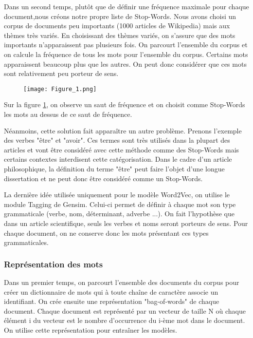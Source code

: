 \documentclass[12pt]{article}
\begin{document}
\noindent
Dans un second temps, plutôt que de définir une fréquence maximale pour chaque document,nous créons notre propre liste de Stop-Words.  Nous avons choisi un corpus de documents peu importants (1000 articles de Wikipedia) mais aux thèmes très variés. En choisissant des thèmes variés, on s'assure que des mots importants n'apparaissent pas plusieurs fois. On parcourt l'ensemble du corpus et on calcule la fréquence de tous les mots pour l'ensemble du corpus. Certains mots apparaissent beaucoup plus que les autres. On peut donc considérer que ces mots sont relativement peu porteur de sens. 



\begin{center}
    

\begin{figure}
    
    \texttt{[image: Figure\_1.png]}
    \caption{}
    \label{fig:stop_word}
\end{figure}
\end{center}
Sur la figure \ref{fig:stop_word}, on observe un saut de fréquence et on choisit comme Stop-Words les mots au dessus de ce saut de fréquence. 

\noindent
Néanmoins, cette solution fait apparaître un autre problème. Prenons l'exemple des verbes "être" et "avoir". Ces termes sont très utilisés dans la plupart des articles et vont être considéré avec cette méthode comme des Stop-Words mais certains contextes interdisent cette catégorisation. Dans le cadre d'un article philosophique, la définition du terme "être" peut faire l'objet d'une longue dissertation et ne peut donc être considéré comme un Stop-Words. 

\noindent
La dernière idée utilisée uniquement pour le modèle Word2Vec, on utilise le module Tagging de Gensim. Celui-ci permet de définir à chaque mot son type grammaticale (verbe, nom, déterminant, adverbe ...). On fait l'hypothèse que dans un article scientifique, seuls les verbes et noms seront porteurs de sens. Pour chaque document, on ne conserve donc les mots présentant ces types grammaticales.


\subsubsection{Représentation des mots}
\noindent
Dans un premier temps, on parcourt l'ensemble des documents du corpus pour créer un dictionnaire de mots qui à toute chaîne de caractère associe un identifiant. On crée ensuite une représentation "bag-of-words" de chaque document. Chaque document est représenté par un vecteur de taille N où chaque élément i du vecteur est le nombre d'occurrence du i-ème mot dans le document. On utilise cette représentation pour entraîner les modèles.
\end{document}
